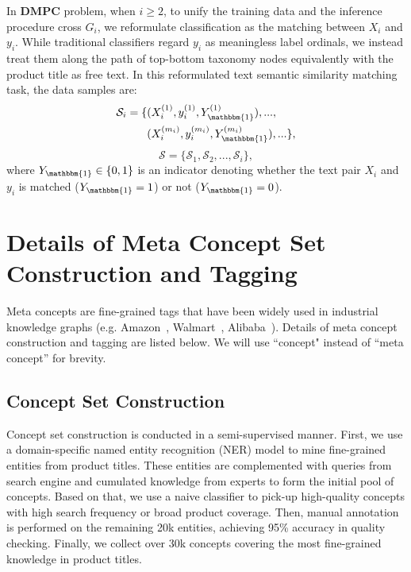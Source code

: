 In $\mathbf{DMPC}$ problem, when $i \geq 2$, to unify the training data and the inference procedure cross $G_i$, 
we reformulate classification as the matching between $X_i$ and $y_i$. 
While traditional classifiers regard $y_i$ as meaningless label ordinals, we instead treat them along the path of top-bottom taxonomy nodes equivalently with the product title as free text. 
In this reformulated text semantic similarity matching task, the data samples are:
\begin{equation*}
\begin{split}
        \mathcal{S}_i=\{&(X_i^{(1)}, y_i^{(1)}, Y_{\mathbbm{1}}^{(1)}),...,\\
        &(X_i^{(m_i)}, y_i^{(m_i)}, Y_{\mathbbm{1}}^{(m_i)}),...\},
\end{split}
\end{equation*}
$$
\mathcal{S}=\{\mathcal{S}_1, \mathcal{S}_2,...,\mathcal{S}_i\},
$$
where $Y_{\mathbbm{1}}\in \{0, 1\}$ is an indicator denoting whether the text pair $X_i$ and $y_i$ is matched ($Y_{\mathbbm{1}}=1$) or not ($Y_{\mathbbm{1}}=0$).


\section{Details of Meta Concept Set Construction and Tagging}
\label{sec:datasetdetails}
Meta concepts are fine-grained tags that have been widely used in industrial knowledge graphs (e.g. Amazon~\cite{dong2020autoknow}, Walmart~\cite{xu2020product}, Alibaba~\cite{luo2020alicoco}). 
Details of meta concept construction and tagging are listed below. We will use ``concept" instead of ``meta concept'' for brevity.

\subsection{Concept Set Construction}

Concept set construction is conducted in a semi-supervised manner.
First, we use a domain-specific named entity recognition (NER) model to mine fine-grained entities from product titles. These entities are complemented with queries from search engine and cumulated knowledge from experts to form the initial pool of concepts. 
Based on that, we use a naive classifier to pick-up high-quality concepts with high search frequency or broad product coverage. 
Then, manual annotation is performed on the remaining 20k entities, achieving 95\% accuracy in quality checking.
Finally, we collect over 30k concepts covering the most fine-grained knowledge in product titles.

